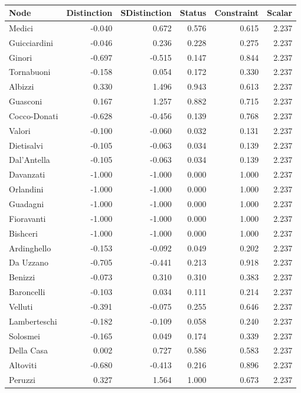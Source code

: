 \begin{table}
\footnotesize
\centering
\caption{\label{tab:label}}
\centering
\begin{tabular}[t]{lrrrrr}
\toprule
Node & Distinction & SDistinction & Status & Constraint & Scalar \\
\midrule
Medici & -0.040 & 0.672 & 0.576 & 0.615 & 2.237\\
Guicciardini & -0.046 & 0.236 & 0.228 & 0.275 & 2.237\\
Ginori & -0.697 & -0.515 & 0.147 & 0.844 & 2.237\\
Tornabuoni & -0.158 & 0.054 & 0.172 & 0.330 & 2.237\\
Albizzi & 0.330 & 1.496 & 0.943 & 0.613 & 2.237\\
Guasconi & 0.167 & 1.257 & 0.882 & 0.715 & 2.237\\
Cocco-Donati & -0.628 & -0.456 & 0.139 & 0.768 & 2.237\\
Valori & -0.100 & -0.060 & 0.032 & 0.131 & 2.237\\
Dietisalvi & -0.105 & -0.063 & 0.034 & 0.139 & 2.237\\
Dal'Antella & -0.105 & -0.063 & 0.034 & 0.139 & 2.237\\
Davanzati & -1.000 & -1.000 & 0.000 & 1.000 & 2.237\\
Orlandini & -1.000 & -1.000 & 0.000 & 1.000 & 2.237\\
Guadagni & -1.000 & -1.000 & 0.000 & 1.000 & 2.237\\
Fioravanti & -1.000 & -1.000 & 0.000 & 1.000 & 2.237\\
Bishceri & -1.000 & -1.000 & 0.000 & 1.000 & 2.237\\
Ardinghello & -0.153 & -0.092 & 0.049 & 0.202 & 2.237\\
Da Uzzano & -0.705 & -0.441 & 0.213 & 0.918 & 2.237\\
Benizzi & -0.073 & 0.310 & 0.310 & 0.383 & 2.237\\
Baroncelli & -0.103 & 0.034 & 0.111 & 0.214 & 2.237\\
Velluti & -0.391 & -0.075 & 0.255 & 0.646 & 2.237\\
Lamberteschi & -0.182 & -0.109 & 0.058 & 0.240 & 2.237\\
Solosmei & -0.165 & 0.049 & 0.174 & 0.339 & 2.237\\
Della Casa & 0.002 & 0.727 & 0.586 & 0.583 & 2.237\\
Altoviti & -0.680 & -0.413 & 0.216 & 0.896 & 2.237\\
Peruzzi & 0.327 & 1.564 & 1.000 & 0.673 & 2.237\\

\end{tabular}
\end{table}
